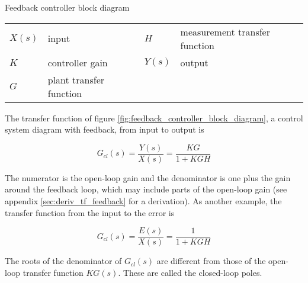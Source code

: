 \begin{bookfigure}

  \caption{Feedback controller block diagram}
  \label{fig:feedback_controller_block_diagram}

  \begin{figurekey}
    \begin{tabulary}{\linewidth}{LLLL}
      $X(s)$ & input & $H$ & measurement transfer function \\
      $K$ & controller gain & $Y(s)$ & output \\
      $G$ & plant transfer function & & \\
    \end{tabulary}
  \end{figurekey}
\end{bookfigure}

The transfer function of figure \ref{fig:feedback_controller_block_diagram}, a
\gls{control system} diagram with feedback, from input to output is

\begin{equation}
  G_{cl}(s) = \frac{Y(s)}{X(s)} = \frac{KG}{1 + KGH}
\end{equation}

The numerator is the \gls{open-loop gain} and the denominator is one plus the
gain around the feedback loop, which may include parts of the
\gls{open-loop gain} (see appendix \ref{sec:deriv_tf_feedback} for a
derivation). As another example, the transfer function from the input to the
\gls{error} is

\begin{equation}
  G_{cl}(s) = \frac{E(s)}{X(s)} = \frac{1}{1 + KGH}
\end{equation}

The roots of the denominator of $G_{cl}(s)$ are different from those of the
open-loop transfer function $KG(s)$. These are called the closed-loop poles.
